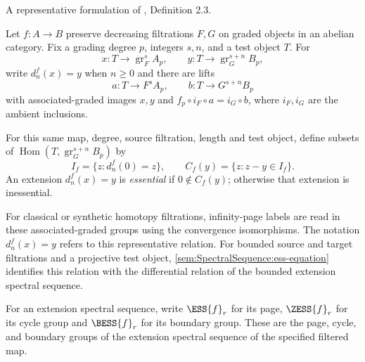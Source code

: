 \begin{definition}
\label{paper:2.3}
A representative formulation of \cite{LWX126}, Definition 2.3.\par

\label{def:768fba8a}
Let $f:A\to B$ preserve decreasing filtrations $F,G$ on graded
objects in an abelian category. Fix a grading degree $p$, integers
$s,n$, and a test object $T$. For
\[
 x:T\longrightarrow\operatorname{gr}_F^s A_p,
 \qquad
 y:T\longrightarrow\operatorname{gr}_G^{s+n}B_p,
\]
write $d_n^f(x)=y$ when $n\geq0$ and there are lifts
\[
 a:T\longrightarrow F^sA_p,
 \qquad b:T\longrightarrow G^{s+n}B_p
\]
with associated-graded images $x,y$ and
$f_p\circ i_F\circ a=i_G\circ b$, where $i_F,i_G$ are the ambient
inclusions.

For this same map, degree, source filtration, length and test object,
define subsets of $\operatorname{Hom}(T,\operatorname{gr}_G^{s+n}B_p)$ by
\[
 I_f=\{z:d_n^f(0)=z\},\qquad C_f(y)=\{z:z-y\in I_f\}.
\]
An extension $d_n^f(x)=y$ is \emph{essential} if $0\notin C_f(y)$;
otherwise that extension is inessential.

For classical or synthetic homotopy filtrations, infinity-page labels
are read in these associated-graded groups using the convergence
isomorphisms. The notation $d_n^f(x)=y$ refers to this
representative relation. For bounded source and target filtrations and
a projective test object, \ref{sem:SpectralSequence:ess-equation}
identifies this relation with the differential relation of the
bounded extension spectral sequence.


\sketch
\end{definition}


For an extension spectral sequence, write $\ESS{f}_r$ for its page,
$\ZESS{f}_r$ for its cycle group and $\BESS{f}_r$ for its boundary
group. These are the page, cycle, and boundary groups of the extension spectral
sequence of the specified filtered map.

